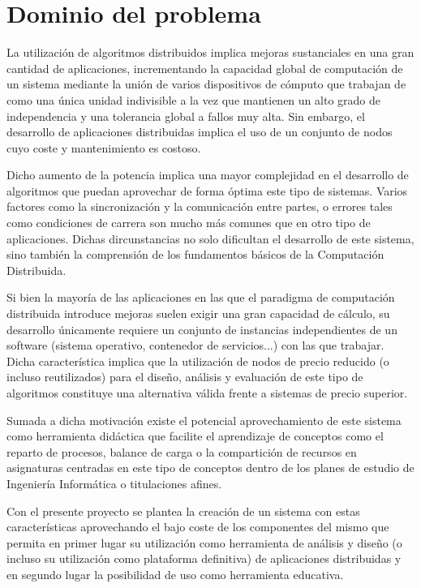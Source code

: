 \chapter{Dominio del problema}

La utilización de algoritmos distribuidos implica mejoras sustanciales en una gran cantidad de aplicaciones, incrementando la capacidad global de computación de un sistema mediante la unión de varios dispositivos de cómputo que trabajan de como una única unidad indivisible a la vez que mantienen un alto grado de independencia y una tolerancia global a fallos muy alta. Sin embargo, el desarrollo de aplicaciones distribuidas implica el uso de un conjunto de nodos cuyo coste y mantenimiento es costoso.

Dicho aumento de la potencia implica una mayor complejidad en el desarrollo de algoritmos que puedan aprovechar de forma óptima este tipo de sistemas. Varios factores como la sincronización y la comunicación entre partes, o errores tales como condiciones de carrera son mucho más comunes que en otro tipo de aplicaciones. Dichas dircunstancias no solo dificultan el desarrollo de este sistema, sino también la comprensión de los fundamentos básicos de la Computación Distribuida. %

Si bien la mayoría de las aplicaciones en las que el paradigma de computación distribuida introduce mejoras suelen exigir una gran capacidad de cálculo, su desarrollo únicamente requiere un conjunto de instancias independientes de un software (sistema operativo, contenedor de servicios...) con las que trabajar. Dicha característica implica que la utilización de nodos de precio reducido (o incluso reutilizados) para el diseño, análisis y evaluación de este tipo de algoritmos constituye una alternativa válida frente a sistemas de precio superior.

Sumada a dicha motivación existe el potencial aprovechamiento de este sistema como herramienta didáctica que facilite el aprendizaje de conceptos como el reparto de procesos, balance de carga o la compartición de recursos en asignaturas centradas en este tipo de conceptos dentro de los planes de estudio de Ingeniería Informática o titulaciones afines.

Con el presente proyecto se plantea la creación de un sistema con estas características aprovechando el bajo coste de los componentes del mismo que permita en primer lugar su utilización como herramienta de análisis y diseño (o incluso su utilización como plataforma definitiva) de aplicaciones distribuidas y en segundo lugar la posibilidad de uso como herramienta educativa.

